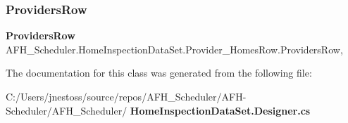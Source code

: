 \mbox{\label{class_a_f_h___scheduler_1_1_home_inspection_data_set_1_1_provider___homes_row_a750543f35d3bd66777b1c35ddf78b1db}} 
\subsubsection{ProvidersRow}
{\footnotesize\ttfamily \textbf{ Providers\+Row} A\+F\+H\+\_\+\+Scheduler.\+Home\+Inspection\+Data\+Set.\+Provider\+\_\+\+Homes\+Row.\+Providers\+Row\hspace{0.3cm}{\ttfamily [get]}, {\ttfamily [set]}}



The documentation for this class was generated from the following file\+:\begin{DoxyCompactItemize}
\item 
C\+:/\+Users/jnestoss/source/repos/\+A\+F\+H\+\_\+\+Scheduler/\+A\+F\+H-\/\+Scheduler/\+A\+F\+H\+\_\+\+Scheduler/\textbf{ Home\+Inspection\+Data\+Set.\+Designer.\+cs}\end{DoxyCompactItemize}
